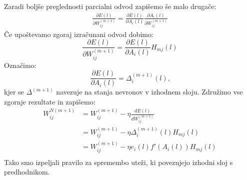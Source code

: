 \documentclass[mat1]{fmfdelo}
\begin{document}
Zaradi boljše preglednosti parcialni odvod zapišemo še malo drugače:
\begin{equation*}
\begin{aligned}
\frac{\partial E(l)}{\partial W^{(m+1)}_{ij}} = \frac{\partial E(l)}{\partial A_i(l)}\frac{\partial A_i(l)}{\partial W^{(m+1)}_{ij}} 
\end{aligned}
\end{equation*}
%
Če upoštevamo zgoraj izračunani odvod dobimo: 
%
\begin{equation*}
\frac{\partial E(l)}{\partial W^{(m+1)}_{ij}} = \frac{\partial E(l)}{\partial A_i(l)}H_{mj}(l) 
\end{equation*}
%
Označimo: 
%
\begin{equation}
\frac{\partial E(l)}{\partial A_i(l)} = \Delta^{(m+1)}_i(l)\text{,}
\label{eq:deltaY}
\end{equation}
%
kjer se $\Delta^{(m+1)}$ navezuje na stanja nevronov v izhodnem sloju.
%
Združimo vse zgornje rezultate in zapišemo:
%
\begin{equation}
\begin{aligned}
W^{N(m+1)}_{ij} &= W ^{(m+1)}_{ij}- \eta \frac{dE(l)}{dW_{ij}^{(m+1)}} \\
&= W ^{(m+1)}_{ij} -\eta  \Delta^{(m+1)}_i (l)H_{mj}(l)\\
&= W ^{(m+1)}_{ij} -\eta e_i(l) f'(A_i(l))H_{mj}(l)\\
\end{aligned}
\end{equation}
%
Tako smo izpeljali pravilo za spremembo uteži, ki povezujejo izhodni sloj s predhodnikom. 
\end{document}
